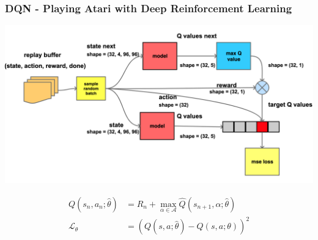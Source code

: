 \documentclass{beamer}
\begin{document}
\begin{frame}
  \frametitle{DQN - Playing Atari with Deep Reinforcement Learning} 

  \centering
  \includegraphics[scale=0.1]{../diagrams/basic/dqn2.png}

    \begin{align*}
    Q(s_{n}, a_{n}; \hat{\theta}) &= R_{n} + \max_{\alpha \in \mathcal{A}} \hat{Q}(s_{n+1}, \alpha; \hat{\theta}) \\
    \mathcal{L_{\theta}} &= (Q(s, a; \hat{\theta}) - Q(s, a; \theta))^2
  \end{align*} 
  
\end{frame}
\end{document}
